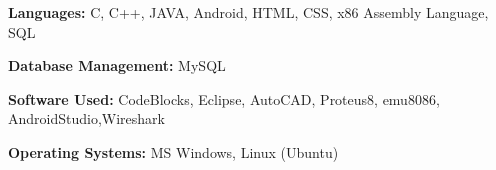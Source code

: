 \textbf{Languages: }
C, C++, JAVA, Android, HTML, CSS, x86 Assembly Language, SQL

\textbf{Database Management: }
MySQL

\textbf{Software Used: }
CodeBlocks, Eclipse, AutoCAD, Proteus8, emu8086, AndroidStudio,Wireshark

\textbf{Operating Systems: }
MS Windows, Linux (Ubuntu)